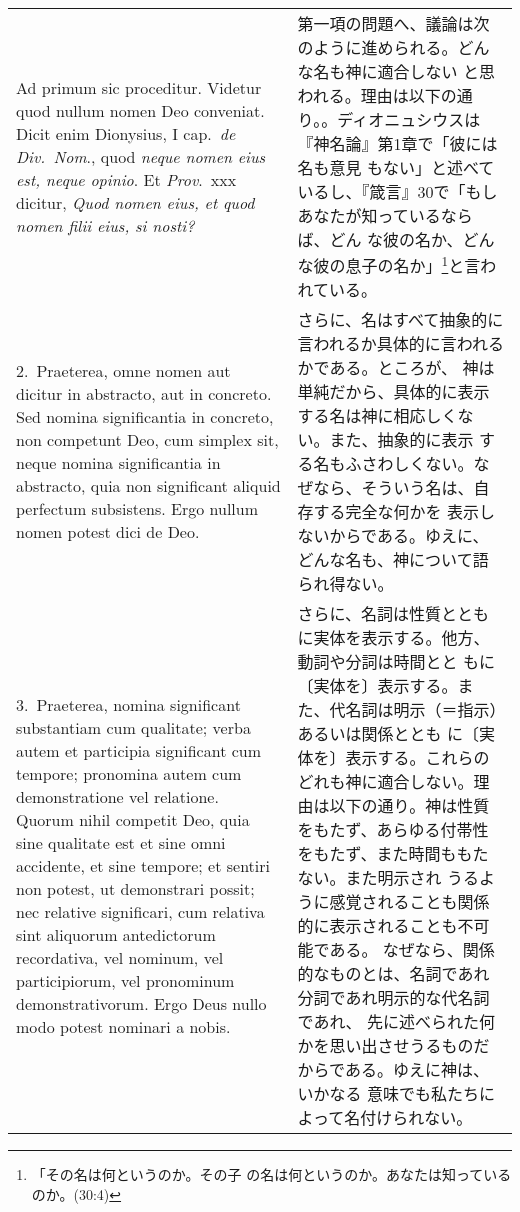 \documentclass[10pt]{jsarticle} %
\begin{document}
\begin{longtable}{p{21em}p{21em}}

{\sc Ad primum sic proceditur}. Videtur quod nullum nomen Deo
conveniat. Dicit enim Dionysius, I cap.\ {\it de Div.\ Nom}., quod {\it neque nomen
eius est, neque opinio}. Et {\it Prov}.\ {\sc xxx} dicitur, {\it Quod nomen eius, et quod nomen filii eius, si nosti?}

&

第一項の問題へ、議論は次のように進められる。どんな名も神に適合しない
と思われる。理由は以下の通り。。ディオニュシウスは『神名論』第1章で「彼には名も意見
もない」と述べているし、『箴言』30で「もしあなたが知っているならば、どん
な彼の名か、どんな彼の息子の名か」\footnote{「その名は何というのか。その子
の名は何というのか。あなたは知っているのか。(30:4)}と言われている。

\\

2.~{\sc Praeterea}, omne nomen aut dicitur in abstracto, aut in
concreto. Sed nomina significantia in concreto, non competunt Deo, cum
simplex sit, neque nomina significantia in abstracto, quia non
significant aliquid perfectum subsistens. Ergo nullum nomen potest dici
de Deo.

&

さらに、名はすべて抽象的に言われるか具体的に言われるかである。ところが、
神は単純だから、具体的に表示する名は神に相応しくない。また、抽象的に表示
する名もふさわしくない。なぜなら、そういう名は、自存する完全な何かを
表示しないからである。ゆえに、どんな名も、神について語られ得ない。

\\


3.~{\sc Praeterea}, nomina significant substantiam cum qualitate;
verba autem et participia significant cum tempore; pronomina autem cum
demonstratione vel relatione. Quorum nihil competit Deo, quia sine
qualitate est et sine omni accidente, et sine tempore; et sentiri non
potest, ut demonstrari possit; nec relative significari, cum relativa
sint aliquorum antedictorum recordativa, vel nominum, vel participiorum,
vel pronominum demonstrativorum. Ergo Deus nullo modo potest nominari a
nobis.

&

さらに、名詞は性質とともに実体を表示する。他方、動詞や分詞は時間とと
もに〔実体を〕表示する。また、代名詞は明示（＝指示）あるいは関係ととも
に〔実体を〕表示する。これらのどれも神に適合しない。理由は以下の通り。神は性質
をもたず、あらゆる付帯性をもたず、また時間ももたない。また明示され
うるように感覚されることも関係的に表示されることも不可能である。
なぜなら、関係的なものとは、名詞であれ分詞であれ明示的な代名詞であれ、
先に述べられた何かを思い出させうるものだからである。ゆえに神は、いかなる
意味でも私たちによって名付けられない。


\end{longtable}
\end{document}
